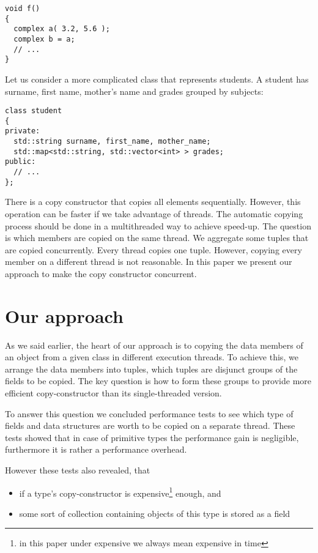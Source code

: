 \documentclass{article}
\begin{document}
\begin{verbatim}
void f()
{
  complex a( 3.2, 5.6 );
  complex b = a;
  // ...
}
\end{verbatim}

Let us consider a more complicated class that represents students. A student has surname,
first name, mother's name and grades grouped by subjects:

\begin{verbatim}
class student
{
private:
  std::string surname, first_name, mother_name;
  std::map<std::string, std::vector<int> > grades;
public:
  // ...
};
\end{verbatim}

There is a copy constructor that copies all elements sequentially. However, this operation
can be faster if we take advantage of threads. The automatic copying process should be done
in a multithreaded way to achieve speed-up. The question is which members are copied on
the same thread. We aggregate some tuples that are copied concurrently. Every thread copies
one tuple. However, copying every member on a different thread is not reasonable. In this
paper we present our approach to make the copy constructor concurrent.

\section{Our approach}
\label{approach}
As we said earlier, the heart of our approach is to copying the data members of an object from a given class in different execution threads. To achieve this, we arrange the data members into tuples, which tuples are disjunct groups of the fields to be copied. The key question is how to form these groups to provide more efficient copy-constructor than its single-threaded version. 

To answer this question we concluded performance tests to see which type of fields and data structures are worth to be copied on a separate thread. These tests showed that in case of primitive types the performance gain is negligible, furthermore it is rather a performance overhead.

However these tests also revealed, that
\begin{itemize}
 \item if a type's copy-constructor is expensive\footnote{in this paper under expensive we always mean expensive in time} enough, and
 \item some sort of collection containing objects of this type is stored as a field
\end{itemize}
\end{document}
